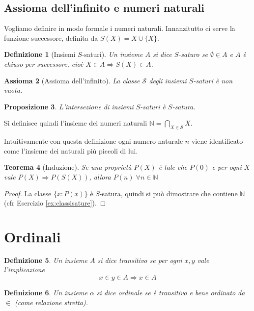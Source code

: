 \documentclass[a4paper,10pt,oneside]{article}
\newcommand{\myname}[1]{\emph{#1}}
\theoremstyle{plain}
\newtheorem{mytheorem}{Teorema}[section]
\newtheorem{mydef}[mytheorem]{Definizione}
\newtheorem{myprop}[mytheorem]{Proposizione}
\newtheorem{myax}[mytheorem]{Assioma}
\theoremstyle{definition}
\theoremstyle{remark}
\begin{document}
\subsection{Assioma dell'infinito e numeri naturali}

Vogliamo definire in modo formale i numeri naturali. Innanzitutto ci serve la funzione successore, definita da $S(X)=X\cup\{X\}$. 
\begin{mydef}[Insiemi $S$-saturi]
Un insieme $A$ si dice $S$-saturo se $\emptyset \in A$ e $A$ è chiuso per successore, cioè $X\in A \Rightarrow S(X)\in A$.
\end{mydef}
\begin{myax}[Assioma dell'infinito]
 La classe $\mathcal S$ degli insiemi $S$-saturi è non vuota.
\end{myax}

\begin{myprop}
 L'intersezione di insiemi $S$-saturi è $S$-satura.
\end{myprop}

Si definisce quindi l'insieme dei numeri naturali $\mathbb N = \bigcap_{X\in \mathcal S} X$. 

Intuitivamente con questa definizione ogni numero naturale $n$ viene identificato come l'insieme dei naturali più piccoli di lui.

\begin{mytheorem}[Induzione]
 Se una proprietà $P(X)$ è tale che $P(0)$ e per ogni $X$ vale $P(X)\Rightarrow P(S(X))$, allora $P(n)\;\forall n\in \mathbb N$
\end{mytheorem}
\begin{proof}
 La classe $\{x: P(x)\}$ è $S$-satura, quindi si può dimostrare che contiene $\mathbb N$ (cfr Esercizio \ref{ex:classisature}).
\end{proof}


\section{Ordinali}

\begin{mydef}
 Un insieme $A$ si dice \myname{transitivo} se per ogni $x,y$ vale l'implicazione 
 \[x\in y \in A \Rightarrow x\in A\]
\end{mydef}

\begin{mydef}
Un insieme $\alpha$ si dice \myname{ordinale} se è transitivo e bene ordinato da $\in$ (come relazione stretta).
\end{mydef}
\end{document}
